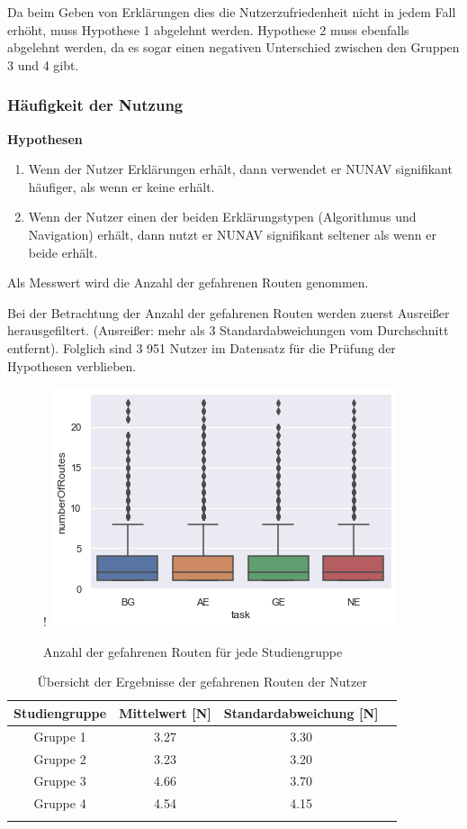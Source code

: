 Da beim Geben von Erklärungen dies die Nutzerzufriedenheit nicht in jedem Fall erhöht, muss Hypothese 1 abgelehnt werden. Hypothese 2 muss ebenfalls abgelehnt werden, da es sogar einen negativen Unterschied zwischen den Gruppen 3 und 4 gibt.

\subsubsection{Häufigkeit der Nutzung}
\label{sec:06_model_evaluation:usage_analysis}

\textbf{Hypothesen}

\begin{enumerate}
    \item Wenn der Nutzer Erklärungen erhält, dann verwendet er NUNAV signifikant häufiger, als wenn er keine erhält.
    \item Wenn der Nutzer einen der beiden Erklärungstypen (Algorithmus und Navigation) erhält, dann nutzt er NUNAV signifikant seltener als wenn er beide erhält.
\end{enumerate}

Als Messwert wird die Anzahl der gefahrenen Routen genommen.

Bei der Betrachtung der Anzahl der gefahrenen Routen werden zuerst Ausreißer herausgefiltert. (Ausreißer: mehr als 3 Standardabweichungen vom Durchschnitt entfernt). Folglich sind 3 951 Nutzer im Datensatz für die Prüfung der Hypothesen verblieben.

\begin{figure}[bth]!
    \includegraphics{contents/06_model_evaluation/res/Usage_Result_Overview.png}
    \caption{Anzahl der gefahrenen Routen für jede Studiengruppe}
\end{figure}

\begin{longtable}{|c|c|c|c|}
    \hline
    \textbf{Studiengruppe}  & \textbf{Mittelwert} [N] & \textbf{Standardabweichung} [N] \\ \hline
    Gruppe 1                & 3.27 & 3.30 \\ \hline
    Gruppe 2                & 3.23 & 3.20 \\ \hline
    Gruppe 3                & 4.66 & 3.70 \\ \hline
    Gruppe 4                & 4.54 & 4.15 \\ \hline
\caption{Übersicht der Ergebnisse der gefahrenen Routen der Nutzer}
\label{tab:study_offroute_results_2}
\end{longtable}


